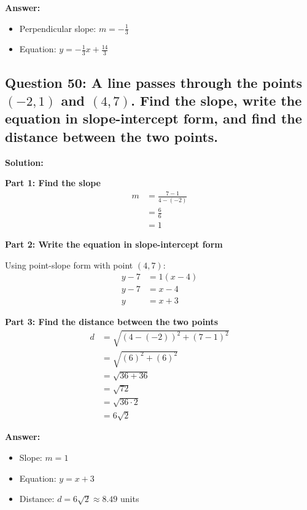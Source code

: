 \documentclass[12pt]{article}
\begin{document}
\textbf{Answer:}
\begin{itemize}
\item Perpendicular slope: $m = -\frac{1}{3}$
\item Equation: $y = -\frac{1}{3}x + \frac{14}{3}$
\end{itemize}

\vspace{0.5cm}

\subsection*{Question 50: A line passes through the points $(-2, 1)$ and $(4, 7)$. Find the slope, write the equation in slope-intercept form, and find the distance between the two points.}

\noindent\textbf{Solution:}

\textbf{Part 1: Find the slope}
\begin{align*}
m &= \frac{7 - 1}{4 - (-2)} \\
&= \frac{6}{6} \\
&= 1
\end{align*}

\textbf{Part 2: Write the equation in slope-intercept form}

Using point-slope form with point $(4, 7)$:
\begin{align*}
y - 7 &= 1(x - 4) \\
y - 7 &= x - 4 \\
y &= x + 3
\end{align*}

\textbf{Part 3: Find the distance between the two points}
\begin{align*}
d &= \sqrt{(4 - (-2))^2 + (7 - 1)^2} \\
&= \sqrt{(6)^2 + (6)^2} \\
&= \sqrt{36 + 36} \\
&= \sqrt{72} \\
&= \sqrt{36 \cdot 2} \\
&= 6\sqrt{2}
\end{align*}

\textbf{Answer:}
\begin{itemize}
\item Slope: $m = 1$
\item Equation: $y = x + 3$
\item Distance: $d = 6\sqrt{2} \approx 8.49$ units
\end{itemize}
\end{document}
